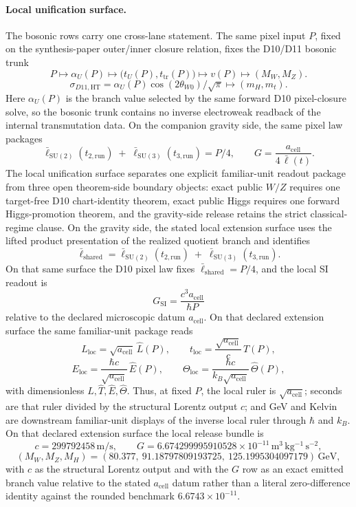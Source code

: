 \documentclass[11pt]{article}
\newcommand{\ellbar}{\bar{\ell}}
\begin{document}
\paragraph{Local unification surface.}
The bosonic rows carry one cross-lane statement. The same pixel input \(P\), fixed on the
synthesis-paper outer/inner closure relation, fixes the
D10/D11 bosonic trunk
\[
P
\longmapsto
\alpha_U(P)
\longmapsto
\bigl(t_U(P),t_{\mathrm{tr}}(P)\bigr)
\longmapsto
v(P)
\longmapsto
\left(M_W,M_Z\right).
\]
\[
\sigma_{D11,\mathrm{HT}}
=
\alpha_U(P)\cos(2\theta_{W0})/\sqrt{\pi}
\longmapsto
\left(m_H,m_t\right).
\]
Here \(\alpha_U(P)\) is the branch value selected by the same forward D10 pixel-closure solve, so
the bosonic trunk contains no inverse electroweak readback of the internal transmutation data.
On the companion gravity side, the same pixel law packages
\[
\ellbar_{\mathrm{SU(2)}}(t_{2,\mathrm{run}})
\;+\;
\ellbar_{\mathrm{SU(3)}}(t_{3,\mathrm{run}})
=
P/4,
\qquad
G=\frac{a_{\mathrm{cell}}}{4\,\ellbar(t)}.
\]
The local unification surface separates one explicit familiar-unit readout package from three
open theorem-side boundary objects: exact public \(W/Z\) requires one target-free D10
chart-identity theorem, exact public Higgs requires one forward Higgs-promotion theorem, and the
gravity-side release retains the strict classical-regime clause.
On the gravity side, the stated local extension surface uses the lifted product presentation of the
realized quotient branch and identifies
\[
\ellbar_{\mathrm{shared}}
=
\ellbar_{\mathrm{SU(2)}}(t_{2,\mathrm{run}})
\;+\;
\ellbar_{\mathrm{SU(3)}}(t_{3,\mathrm{run}}).
\]
On that same surface the D10 pixel law fixes \(\ellbar_{\mathrm{shared}}=P/4\),
and the local SI readout is
\[
G_{\mathrm{SI}}=\frac{c^3 a_{\mathrm{cell}}}{\hbar P}
\]
relative to the declared microscopic datum \(a_{\mathrm{cell}}\). On that declared extension
surface the same familiar-unit package reads
\[
L_{\mathrm{loc}}=\sqrt{a_{\mathrm{cell}}}\,\widehat L(P),
\qquad
t_{\mathrm{loc}}=\frac{\sqrt{a_{\mathrm{cell}}}}{c}\,\widehat T(P),
\]
\[
E_{\mathrm{loc}}=\frac{\hbar c}{\sqrt{a_{\mathrm{cell}}}}\,\widehat E(P),
\qquad
\Theta_{\mathrm{loc}}=\frac{\hbar c}{k_B\sqrt{a_{\mathrm{cell}}}}\,\widehat\Theta(P),
\]
with dimensionless \(\widehat L,\widehat T,\widehat E,\widehat\Theta\). Thus, at fixed \(P\), the
local ruler is \(\sqrt{a_{\mathrm{cell}}}\); seconds are that ruler divided by the structural
Lorentz output \(c\); and GeV and Kelvin are downstream familiar-unit displays of the inverse
local ruler through \(\hbar\) and \(k_B\). On that declared extension
surface the local release bundle is
\[
c=299792458\,\mathrm{m/s},
\qquad
G=6.674299995910528\times10^{-11}\,\mathrm{m^3\,kg^{-1}\,s^{-2}},
\]
\[
(M_W,M_Z,M_H)=
(80.377,\ 91.18797809193725,\ 125.1995304097179)\,\mathrm{GeV},
\]
with \(c\) as the structural Lorentz output and with the \(G\) row as an exact emitted branch
value relative to the stated \(a_{\mathrm{cell}}\) datum rather than a literal zero-difference identity against the rounded benchmark
\(6.6743\times10^{-11}\).
\end{document}
